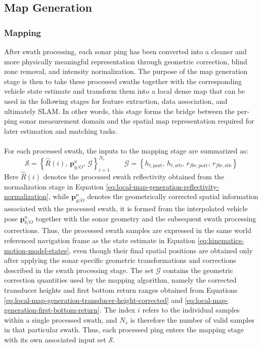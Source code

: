 \subsection{Map Generation}
\subsubsection{Mapping}
After swath processing, each sonar ping has been converted into a cleaner and more physically meaningful representation through geometric correction, blind zone removal, and intensity normalization. The purpose of the map generation stage is then to take these processed swaths together with the corresponding vehicle state estimate and transform them into a local dense map that can be used in the following stages for feature extraction, data association, and ultimately SLAM. In other words, this stage forms the bridge between the per-ping sonar measurement domain and the spatial map representation required for later estimation and matching tasks.
\\ \\
For each processed swath, the inputs to the mapping stage are summarized as:
$$
    \mathcal{S} = \left\{ \hat{R}(i), \, \mathbf{p}_{g/O}^{n}, \, \mathcal{G} \right\}_{i=1}^{N_s}
    \qquad
    \mathcal{G} = \left\{h_{t,\mathrm{port}}, \, h_{t,\mathrm{stb}}, \, r_{fbr,\mathrm{port}}, \, r_{fbr,\mathrm{stb}} \right\}
$$
Here $\hat{R}(i)$ denotes the processed swath reflectivity obtained from the normalization stage in Equation \ref{eq:local-map-generation-reflectivity-normalization}, while $\mathbf{p}_{g/O}^{n}$ denotes the geometrically corrected spatial information associated with the processed swath, it is formed from the interpolated vehicle pose $\mathbf{p}_{b/O}^{n}$ together with the sonar geometry and the subsequent swath processing corrections. Thus, the processed swath samples are expressed in the same world referenced navigation frame as the state estimate in Equation \ref{eq:kinematics-motion-model-states}, even though their final spatial positions are obtained only after applying the sonar specific geometric transformations and corrections described in the swath processing stage. The set $\mathcal{G}$ contains the geometric correction quantities used by the mapping algorithm, namely the corrected transducer heights and first bottom return ranges obtained from Equations \ref{eq:local-map-generation-transducer-height-corrected} and \ref{eq:local-map-generation-first-bottom-return}. The index $i$ refers to the individual samples within a single processed swath, and $N_s$ is therefore the number of valid samples in that particular swath. Thus, each processed ping enters the mapping stage with its own associated input set $\mathcal{S}$.
